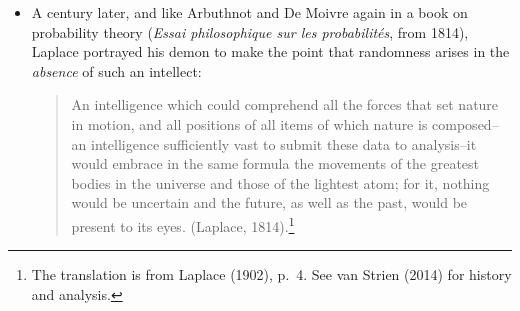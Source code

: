 \documentclass[11pt,a4paper]{article}
\numberwithin{equation}{section}
\begin{document}
\begin{itemize}
\begin{quote}
\begin{small}
It is impossible for a Die, with such determin'd force and direction, not to fall on such determin'd side, only I don't know the force and direction which makes it fall on such determin'd side, and therefore I call it Chance, which is nothing but the want of Art. (Arbuthnot, 1692).\footnote{The Latin original \emph{De Ratiociniis in Ludo Aleae} is from 1657 and Arbuthnot's English translation \emph{On the Laws of Chance} appeared in 1692. The quotation is taken from Diaconis \& Skyrms (2018), p.\ 9. }
\end{small}
\end{quote}
And similarly, but highlighting the alleged negativity of the  concept even more:
\begin{quote}\begin{small}
\emph{Chance}, in atheistical writings or discourse, is a sound utterly insignificant: It imports no determination to any \emph{mode of Existence}; nor in deed to \emph{Existence} itself, more than to \emph{non existence}; it can neither be defined nor understood; nor can any Proposition concerning it be either affirmed or denied, excepting this one, ``That it is a mere word." (De Moivre, 1718).\footnote{Quoted  by Hacking (1990, p.\ 13) from De Moivre's \emph{Doctrine of Chance}, originally written in English.}\end{small}
\end{quote}
So this is entirely in the medieval spirit, where 
ignorance--this time relative to Newton's physics as the ticket to full knowledge--is seen as the origin of randomness.
\item A century later, and like Arbuthnot and De Moivre again in a book on probability theory (\emph{Essai philosophique sur les probabilit\'{e}s}, from 1814), 
Laplace portrayed his  demon  to make the point that randomness arises in the \emph{absence} of such an intellect:
\begin{quote}\begin{small}
An intelligence which could comprehend
all the forces that set nature in motion, and all positions of all items of which nature is composed--an intelligence sufficiently vast to submit these data to analysis--it
would embrace in the same formula the movements of the greatest bodies
in the universe and those of the lightest atom; for it, nothing would be
uncertain and the future, as well as the past, would be present to its eyes. (Laplace, 1814).\footnote{The translation is from Laplace (1902), p.\ 4. See van Strien (2014) for history and  analysis.}  \end{small}

\end{quote}
\end{itemize}
\end{document}
